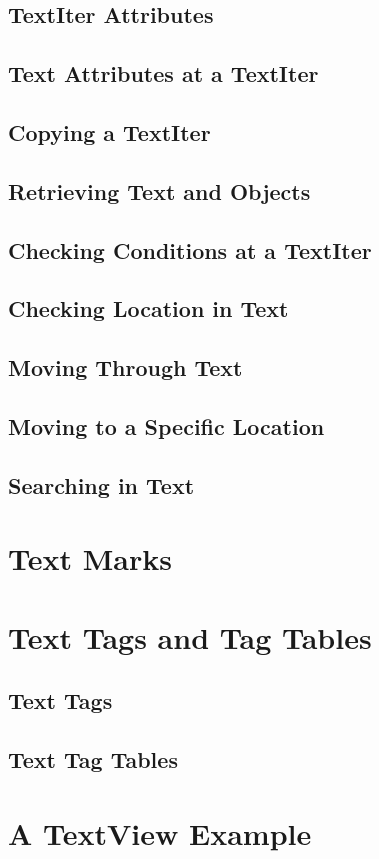 	\subsection{TextIter Attributes}
	\subsection{Text Attributes at a TextIter}
	\subsection{Copying a TextIter}
	\subsection{Retrieving Text and Objects}
	\subsection{Checking Conditions at a TextIter}
	\subsection{Checking Location in Text}
	\subsection{Moving Through Text}
	\subsection{Moving to a Specific Location}
	\subsection{Searching in Text}
\section{Text Marks}
\section{Text Tags and Tag Tables}
	\subsection{Text Tags}
	\subsection{Text Tag Tables}
\section{A TextView Example}
